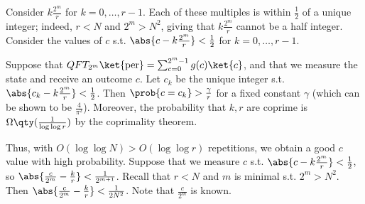 Consider $k\frac{2^m}{r}$ for $k = 0, \dots, r-1$.
Each of these multiples is within $\frac{1}{2}$ of a unique integer; indeed, $r < N$ and $2^m > N^2$, giving that $k\frac{2^m}{r}$ cannot be a half integer.
Consider the values of $c$ s.t. $\abs{c - k \frac{2^m}{r}} < \frac{1}{2}$ for $k = 0, \dots, r-1$.
\begin{theorem}
    Suppose that $QFT_{2^m} \ket{\mathrm{per}} = \sum_{c=0}^{2^m - 1} g(c) \ket{c}$, and that we measure the state and receive an outcome $c$.
    Let $c_k$ be the unique integer s.t. $\abs{c_k - k\frac{2^m}{r}} < \frac{1}{2}$.
    Then $\prob{c = c_k} > \frac{\gamma}{r}$ for a fixed constant $\gamma$ (which can be shown to be $\frac{4}{\pi^2}$).
    Moreover, the probability that $k, r$ are coprime is $\Omega\qty(\frac{1}{\log \log r})$ by the coprimality theorem.
\end{theorem}
Thus, with $O(\log \log N) > O(\log \log r)$ repetitions, we obtain a good $c$ value with high probability.
Suppose that we measure $c$ s.t. $\abs{c - k \frac{2^m}{r}} < \frac{1}{2}$, so $\abs{\frac{c}{2^m} - \frac{k}{r}} < \frac{1}{2^{m+1}}$.
Recall that $r < N$ and $m$ is minimal s.t. $2^m > N^2$.
Then $\abs{\frac{c}{2^m} - \frac{k}{r}} < \frac{1}{2N^2}$.
Note that $\frac{c}{2^m}$ is known.

